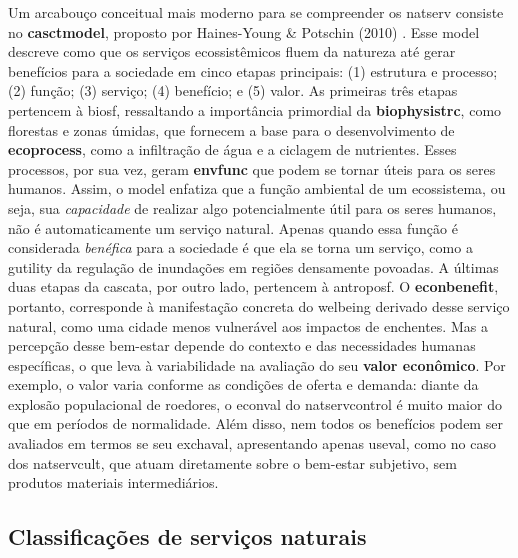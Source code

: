 \documentclass[./main.tex]{subfiles}
\begin{document}
\par Um arcabouço conceitual mais moderno para se compreender os \gls{natserv} consiste no \textbf{\gls{casctmodel}}, proposto por Haines-Young \& Potschin (2010) \cite{haines-young2010, potschin2016}. Esse \gls{model} descreve como que os serviços ecossistêmicos fluem da natureza até gerar benefícios para a sociedade em cinco etapas principais: (1) estrutura e processo; (2) função; (3) serviço; (4) benefício; e (5) valor. As primeiras três etapas pertencem à \gls{biosf}, ressaltando a importância primordial da \textbf{\gls{biophysistrc}}, como florestas e zonas úmidas, que fornecem a base para o desenvolvimento de \textbf{\gls{ecoprocess}}, como a infiltração de água e a ciclagem de nutrientes. Esses processos, por sua vez, geram \textbf{\gls{envfunc}} que podem se tornar úteis para os seres humanos. Assim, o \gls{model} enfatiza que a função ambiental de um ecossistema, ou seja, sua \textit{capacidade} de realizar algo potencialmente útil para os seres humanos, não é automaticamente um serviço natural. Apenas quando essa função é considerada \textit{benéfica} para a sociedade é que ela se torna um serviço, como a \gls{gutility} da regulação de inundações em regiões densamente povoadas. A últimas duas etapas da cascata, por outro lado, pertencem à \gls{antroposf}. O \textbf{\gls{econbenefit}}, portanto, corresponde à manifestação concreta do \gls{welbeing} derivado desse serviço natural, como uma cidade menos vulnerável aos impactos de enchentes. Mas a percepção desse bem-estar depende do contexto e das necessidades humanas específicas, o que leva à variabilidade na avaliação do seu \textbf{valor econômico}. Por exemplo, o valor varia conforme as condições de oferta e demanda: diante da explosão populacional de roedores, o \gls{econval} do \gls{natservcontrol} é muito maior do que em períodos de normalidade. Além disso, nem todos os benefícios podem ser avaliados em termos se seu \gls{exchaval}, apresentando apenas \gls{useval}, como no caso dos \gls{natservcult}, que atuam diretamente sobre o bem-estar subjetivo, sem produtos materiais intermediários.

\subsection{Classificações de serviços naturais} \label{sec:natserv:sist}
\end{document}
